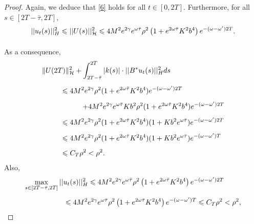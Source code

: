 \documentclass[11pt]{article}
\renewcommand{\leq}{\leqslant}
\begin{document}
\begin{proof}
Again, we deduce that \eqref{6} holds for all $t\in [0,2T]$. Furthermore, for all $s\in [2T-\bar{\tau},2T],$
$$\begin{array}{l}
	\vspace{0.3cm}\displaystyle{||u_t(s)||_H^2 \leq ||U(s)||_{\mathcal{H}}^2\leq  4M^2e^{2\gamma}e^{\omega\bar{\tau}}\rho^2\left(1+e^{2\omega\bar{\tau}}K^2b^4\right)e^{-(\omega-\omega')2T}.}
\end{array}$$
As a consequence,
\begin{equation}\label{10}
\begin{array}{l}
		\vspace{0.3cm}\displaystyle{\Vert  U(2T)\Vert^2_{\mathcal H}+\int_{2T-\bar{\tau}}^{2T}|k(s)| \cdot ||B^*u_t(s)||_H^2 ds}\\
		\vspace{0.3cm}\displaystyle{\hspace{1cm}\leq 4 M^2e^{2\gamma}\rho^2(1+e^{2\omega \bar{\tau}}K^2b^4)e^{-(\omega-\omega')2T}}\\
		\vspace{0.3cm}\displaystyle{\hspace{2cm}+4 M^2e^{2\gamma}e^{\omega\bar{\tau}}Kb^2\rho^2 (1+e^{2\omega \bar{\tau}}K^2b^4)e^{-(\omega-\omega')2T}}\\
		\vspace{0.3cm}\displaystyle{\hspace{1cm}\leq 4 M^2e^{2\gamma}\rho^2 (1+e^{2\omega \bar{\tau}}K^2b^4)(1+Kb^2e^{\omega\bar{\tau}})e^{-(\omega-\omega')2T}}\\
		\vspace{0.3cm}\displaystyle{\hspace{1cm}\leq 4 M^2e^{2\gamma}\rho^2 (1+e^{2\omega \bar{\tau}}K^2b^4)(1+Kb^2e^{\omega\bar{\tau}})e^{-(\omega-\omega')T}}\\
		\displaystyle{\hspace{1cm}\leq C_T\rho^2<\rho^2.}
	\end{array}
\end{equation}
Also,
$$\begin{array}{l}
	\vspace{0.3cm}\displaystyle{\max_{s\in [2T-\bar{\tau},2T]}||u_t(s)||_H^2\leq 4M^2e^{2\gamma}e^{\omega\bar{\tau}}\rho^2 \left(1+e^{2\omega\bar{\tau}}K^2b^4\right)e^{-(\omega-\omega')2T}}\\
	\displaystyle{\hspace{2cm}\leq 4M^2e^{2\gamma}e^{\omega\bar{\tau}}\rho^2 \left(1+e^{2\omega\bar{\tau}}K^2b^4\right)e^{-(\omega-\omega')T}\leq C_T\rho^2<\rho^2,}

\end{array}$$
\end{proof}
\end{document}
